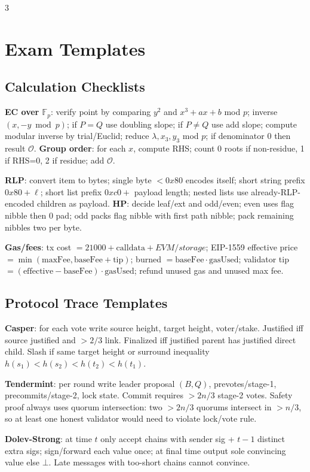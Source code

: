 \documentclass[8pt]{extarticle}
\newcommand{\term}[1]{\textbf{#1}}
\newcommand{\F}{\mathbb{F}}
\begin{document}
\begin{multicols*}{3}
\section{Exam Templates}
\subsection{Calculation Checklists}
\term{EC over $\F_p$}: verify point by comparing $y^2$ and $x^3+ax+b$ mod $p$; inverse $(x,-y\bmod p)$; if $P=Q$ use doubling slope; if $P\ne Q$ use add slope; compute modular inverse by trial/Euclid; reduce $\lambda,x_3,y_3$ mod $p$; if denominator 0 then result $\mathcal O$. \term{Group order}: for each $x$, compute RHS; count 0 roots if non-residue, 1 if RHS=0, 2 if residue; add $\mathcal O$.

\term{RLP}: convert item to bytes; single byte $<0x80$ encodes itself; short string prefix $0x80+\ell$; short list prefix $0xc0+$ payload length; nested lists use already-RLP-encoded children as payload. \term{HP}: decide leaf/ext and odd/even; even uses flag nibble then 0 pad; odd packs flag nibble with first path nibble; pack remaining nibbles two per byte.

\term{Gas/fees}: tx cost $=21000+\mathrm{calldata}+EVM/storage$; EIP-1559 effective price $=\min(\mathrm{maxFee},\mathrm{baseFee}+\mathrm{tip})$; burned $=\mathrm{baseFee}\cdot\mathrm{gasUsed}$; validator tip $=(\mathrm{effective}-\mathrm{baseFee})\cdot\mathrm{gasUsed}$; refund unused gas and unused max fee.

\subsection{Protocol Trace Templates}
\term{Casper}: for each vote write source height, target height, voter/stake. Justified iff source justified and $>2/3$ link. Finalized iff justified parent has justified direct child. Slash if same target height or surround inequality $h(s_1)<h(s_2)<h(t_2)<h(t_1)$.

\term{Tendermint}: per round write leader proposal $(B,Q)$, prevotes/stage-1, precommits/stage-2, lock state. Commit requires $>2n/3$ stage-2 votes. Safety proof always uses quorum intersection: two $>2n/3$ quorums intersect in $>n/3$, so at least one honest validator would need to violate lock/vote rule.

\term{Dolev-Strong}: at time $t$ only accept chains with sender sig + $t-1$ distinct extra sigs; sign/forward each value once; at final time output sole convincing value else $\bot$. Late messages with too-short chains cannot convince.


\end{multicols*}
\end{document}
